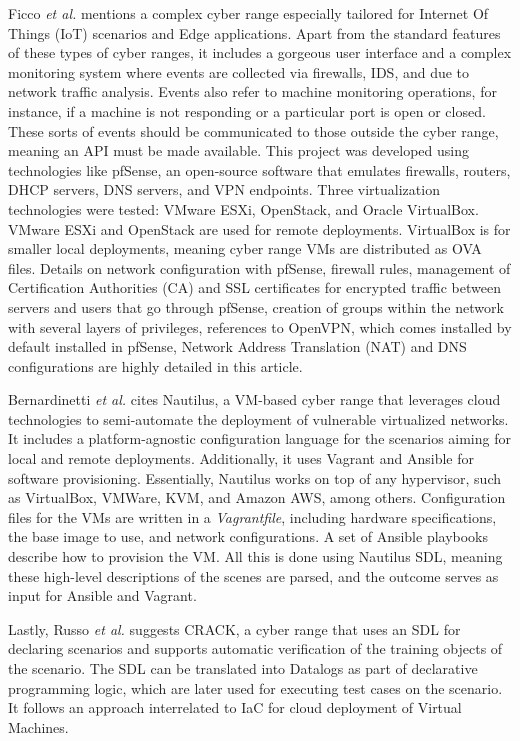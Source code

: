 Ficco \textit{et al.} \cite{leaf_ref} mentions a complex cyber range especially tailored for Internet Of Things (IoT) scenarios and Edge applications. Apart from the standard features of these types of cyber ranges, it includes a gorgeous user interface and a complex monitoring system where events are collected via firewalls, IDS, and due to network traffic analysis. Events also refer to machine monitoring operations, for instance, if a machine is not responding or a particular port is open or closed. These sorts of events should be communicated to those outside the cyber range, meaning an API must be made available. This project was developed using technologies like pfSense, an open-source software that emulates firewalls, routers, DHCP servers, DNS servers, and VPN endpoints. Three virtualization technologies were tested: VMware ESXi, OpenStack, and Oracle VirtualBox. VMware ESXi and OpenStack are used for remote deployments. VirtualBox is for smaller local deployments, meaning cyber range VMs are distributed as OVA files. Details on network configuration with pfSense, firewall rules, management of Certification Authorities (CA) and SSL certificates for encrypted traffic between servers and users that go through pfSense, creation of groups within the network with several layers of privileges, references to OpenVPN, which comes installed by default installed in pfSense, Network Address Translation (NAT) and DNS configurations are highly detailed in this article.

Bernardinetti \textit{et al.} \cite{nautilus_ref} cites Nautilus, a VM-based cyber range that leverages cloud technologies to semi-automate the deployment of vulnerable virtualized networks. It includes a platform-agnostic configuration language for the scenarios aiming for local and remote deployments. Additionally, it uses Vagrant and Ansible for software provisioning. Essentially, Nautilus works on top of any hypervisor, such as VirtualBox, VMWare, KVM, and Amazon AWS, among others. Configuration files for the VMs are written in a \textit{Vagrantfile}, including hardware specifications, the base image to use, and network configurations. A set of Ansible playbooks describe how to provision the VM. All this is done using Nautilus SDL, meaning these high-level descriptions of the scenes are parsed, and the outcome serves as input for Ansible and Vagrant.

Lastly, Russo \textit{et al.} \cite{crack_ref} suggests CRACK, a cyber range that uses an SDL for declaring scenarios and supports automatic verification of the training objects of the scenario. The SDL can be translated into Datalogs as part of declarative programming logic, which are later used for executing test cases on the scenario. It follows an approach interrelated to IaC for cloud deployment of Virtual Machines. 

